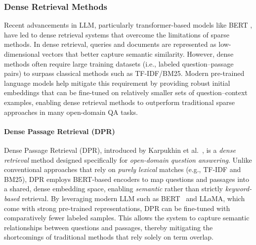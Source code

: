 \subsubsection{Dense Retrieval Methods}

Recent advancements in \gls{LLM}, particularly transformer-based models like \gls{BERT} \cite{bertpretrainingdeepbidirectional}, have led to dense retrieval systems that overcome the limitations of sparse methods. In dense retrieval, queries and documents are represented as low-dimensional vectors that better capture semantic similarity. However, dense methods often require large training datasets (i.e., labeled question–passage pairs) to surpass classical methods such as TF-IDF/BM25. Modern pre-trained language models help mitigate this requirement by providing robust initial embeddings that can be fine-tuned on relatively smaller sets of question–context examples, enabling dense retrieval methods to outperform traditional sparse approaches in many open-domain QA tasks.

\paragraph{Dense Passage Retrieval (DPR)}
\label{par:dpr}

Dense Passage Retrieval (DPR), introduced by Karpukhin et al.~\cite{densepassageretrievalopendomainkarpukhin2020}, is a \textit{dense retrieval} method designed specifically for \textit{open-domain question answering}. Unlike conventional approaches that rely on \textit{purely lexical} matches (e.g., TF-IDF and BM25), DPR employs \gls{BERT}-based encoders to map questions and passages into a shared, dense embedding space, enabling \textit{semantic} rather than strictly \textit{keyword-based} retrieval. By leveraging modern \gls{LLM} such as \gls{BERT}~\cite{bertpretrainingdeepbidirectional} and LLaMA, which come with strong pre-trained representations, DPR can be fine-tuned with comparatively fewer labeled samples. This allows the system to capture semantic relationships between questions and passages, thereby mitigating the shortcomings of traditional methods that rely solely on term overlap.

